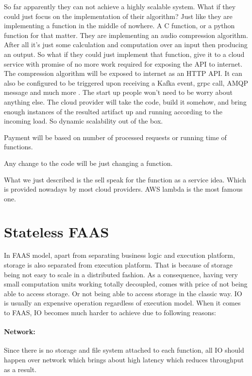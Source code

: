 \documentclass[a4]{report}
\begin{document}
        So far apparently they can not achieve a highly scalable system.
        What if they could just focus on the implementation of their algorithm?
        Just like they are implementing a function in the middle of nowhere.
        A C function, or a python function for that matter.
        They are implementing an audio compression algorithm.
        After all it's just some calculation and computation over an input then producing an output.
        So what if they could just implement that function, give it to a cloud service with promise of no more work
        required for exposing the API to internet.
        The compression algorithm will be exposed to internet as an HTTP API.
        It can also be configured to be triggered upon receiving a Kafka event, grpc call, AMQP message and much more .
        The start up people won't need to be worry about anything else.
        The cloud provider will take the code, build it somehow, and bring enough instances of the resulted artifact up and
        running according to the incoming load.
        So dynamic scalability out of the box.

        Payment will be based on number of processed requests or running time of functions.

        Any change to the code will be just changing a function.

        What we just described is the sell speak for the function as a service idea.
        Which is provided nowadays by most cloud providers.
        AWS lambda\cite{lambda} is the most famous one.

        \section{Stateless FAAS}
        In FAAS model, apart from separating business logic and execution platform, storage is also separated from
        execution platform.
        That is because of storage being not easy to scale in a distributed fashion.
        As a consequence, having very small computation units working totally decoupled, comes with price of not being
        able to access storage.
        Or not being able to access storage in the classic way.
        IO is usually an expensive operation regardless of execution model.
        When it comes to FAAS, IO becomes much harder to achieve due to following reasons:

        \paragraph{Network:} Since there is no storage and file system attached to each function, all IO should happen
        over network which brings about high latency which reduces throughput as a result.
\end{document}
